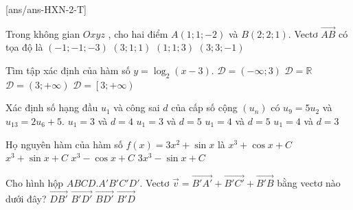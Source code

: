 \def\sode{2}
\begin{name}
	{\tenchude}
	{\tendethi}
	{\tentruong}
	{\thoigian}
\end{name}
\caulc
{}[ans/ans-HXN-\sode-T]

\begin{ex}%
    Trong không gian $Oxyz$ , cho hai điểm $A\left(1;1;-2\right)$ và $B\left(2;2;1\right)$. Vectơ $\overrightarrow{AB}$ có tọa độ là
    \choice
    {$\left(-1;-1;-3\right)$}
    {$\left(3;1;1\right)$}
    {\True $\left(1;1;3\right)$}
    {$\left(3;3;-1\right)$}
\end{ex}

\begin{ex}%
    Tìm tập xác định của hàm số $y=\log_2\left(x-3\right)$.
    \choice
    {$\mathscr{D}=\left(-\infty;3\right)$}
    {$\mathscr{D}=\mathbb{R}$}
    {\True $\mathscr{D}=\left(3;+\infty\right)$}
    {$\mathscr{D}=\left[3;+\infty\right)$}
\end{ex}

\begin{ex}%
    Xác định số hạng đầu $u_1$ và công sai $d$ của cấp số cộng $\left(u_n\right)$ có $u_9=5u_2$ và $u_{13}=2u_6+5$.
    \choice
    {\True $u_1=3$ và $d=4$}
    {$u_1=3$ và $d=5$}
    {$u_1=4$ và $d=5$}
    {$u_1=4$ và $d=3$}
\end{ex}

\begin{ex}%
    Họ nguyên hàm của hàm số $f(x)=3x^2+\sin x$ là 
    \choice
    {$x^3+\cos x+C$}
    {$x^3+\sin x+C$}
    {\True $x^3-\cos x+C$}
    {$3x^3-\sin x+C$}
\end{ex}

\begin{ex}%
    Cho hình hộp $ABCD.A'B'C'D'$. Vectơ $\vec{v}=\overrightarrow{B'A'}+\overrightarrow{B'C'}+\overrightarrow{B'B}$ bằng vectơ nào dưới đây?
    \choice
    {$\overrightarrow{DB'}$}
    {$\overrightarrow{B'D'}$}
    {$\overrightarrow{BD'}$}
    {\True $\overrightarrow{B'D}$}
\end{ex}

